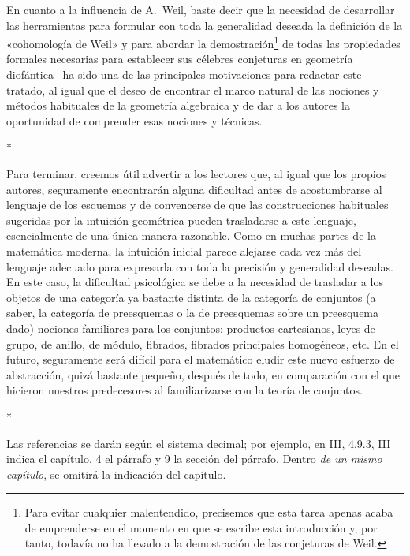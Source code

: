 En cuanto a la influencia de A.~Weil, baste decir que la necesidad de desarrollar las herramientas para formular con toda la generalidad deseada la definición de la «cohomología de Weil» y para abordar la demostración\footnote{Para evitar cualquier malentendido, precisemos que esta tarea apenas acaba de emprenderse en el momento en que se escribe esta introducción y, por tanto, todavía no ha llevado a la demostración de las conjeturas de Weil.} de todas las propiedades formales necesarias para establecer sus célebres conjeturas en geometría diofántica~\cite{I-19} ha sido una de las principales motivaciones para redactar este tratado, al igual que el deseo de encontrar el marco natural de las nociones y métodos habituales de la geometría algebraica y de dar a los autores la oportunidad de comprender esas nociones y técnicas.

\bigskip
\begin{center}*\quad*\quad*\end{center}
\bigskip

Para terminar, creemos útil advertir a los lectores que, al igual que los propios autores, seguramente encontrarán alguna dificultad antes de acostumbrarse al lenguaje de los esquemas y de convencerse de que las construcciones habituales sugeridas por la intuición geométrica pueden trasladarse a este lenguaje, esencialmente de una única manera razonable.
Como en muchas partes de la matemática moderna, la intuición inicial parece alejarse cada vez más del lenguaje adecuado para expresarla con toda la precisión y generalidad deseadas.
En este caso, la dificultad psicológica se debe a la necesidad de trasladar a los objetos de una categoría ya bastante distinta de la categoría de conjuntos (a saber, la categoría de preesquemas o la de preesquemas sobre un preesquema dado) nociones familiares para los conjuntos: productos cartesianos, leyes de grupo, de anillo, de módulo, fibrados, fibrados principales homogéneos, etc.
En el futuro, seguramente será difícil para el matemático eludir este nuevo esfuerzo de abstracción, quizá bastante pequeño, después de todo, en comparación con el que hicieron nuestros predecesores al familiarizarse con la teoría de conjuntos.

\bigskip
\begin{center}*\quad*\quad*\end{center}
\bigskip

Las referencias se darán según el sistema decimal; por ejemplo, en III, 4.9.3, III indica el capítulo, 4 el párrafo y 9 la sección del párrafo.
Dentro \emph{de un mismo capítulo}, se omitirá la indicación del capítulo.

